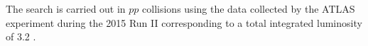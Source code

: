 The search is carried out in $pp$ collisions using the data collected by the
ATLAS experiment during the 2015 Run II corresponding to a total integrated
luminosity of 3.2 \ifb.
